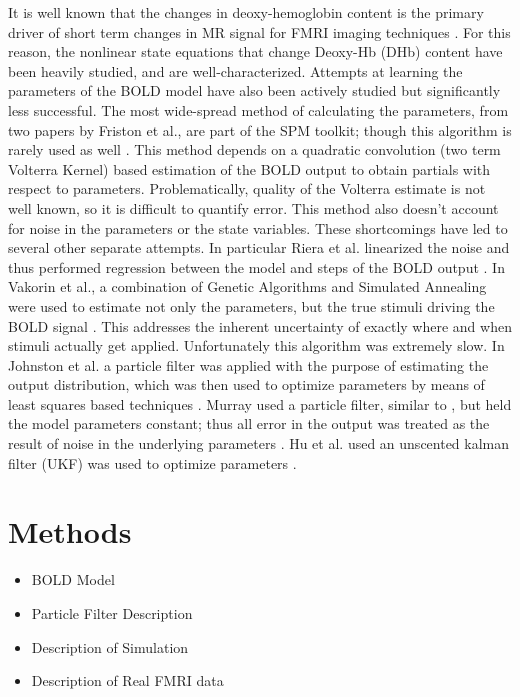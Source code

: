 \documentclass[journal]{./IEEEtran}
\begin{document}
It is well known that the changes in deoxy-hemoglobin content is the
primary driver of short term changes in MR signal for FMRI imaging
techniques \cite{Buxton1998, WEISSKOFF1994, Ogawa, Obata2004}. For
this reason, the nonlinear state equations that change Deoxy-Hb (DHb) 
content have been heavily studied, and are well-characterized. Attempts
at learning the parameters of the BOLD model have also been actively
studied but significantly less successful. The most wide-spread method
of calculating the parameters, from two papers by Friston et al., 
are part of the SPM toolkit; though this algorithm is rarely used 
as well \cite{Friston2000, Friston2002b}. 
This method depends on a quadratic convolution (two term Volterra Kernel)
based estimation of the BOLD output to obtain partials with respect 
to parameters. Problematically, quality of the Volterra estimate
is not well known, so it is difficult to quantify error. This method 
also doesn't account for noise in the parameters or the state variables.
These shortcomings have led to several other separate attempts. In particular 
Riera et al. linearized the noise and thus performed regression between
the model and steps of the BOLD output \cite{Riera2003}. 
In Vakorin et al., a combination of Genetic Algorithms and Simulated 
Annealing were used to estimate not only the parameters, but the 
true stimuli driving the BOLD signal \cite{Vakorin2007}. 
This addresses the inherent uncertainty of exactly where and when 
stimuli actually get applied. Unfortunately this algorithm was extremely slow.
In Johnston et al. a particle filter was applied with the purpose of
estimating the output distribution, which was then used to optimize
parameters by means of least squares based techniques \cite{Johnston2008}. 
Murray used a particle filter, similar to \cite{Johnston2008}, but
held the model parameters constant; thus all error in the output
was treated as the result of noise in the underlying parameters 
\cite{Murray2008}.  Hu et al. used an unscented kalman filter (UKF) 
was used to optimize parameters \cite{Hu2009}.

\section{Methods}
\label{sec:Methods}
\begin{itemize}
\item BOLD Model
\item Particle Filter Description 
\item Description of Simulation
\item Description of Real FMRI data
\end{itemize}
\end{document}
